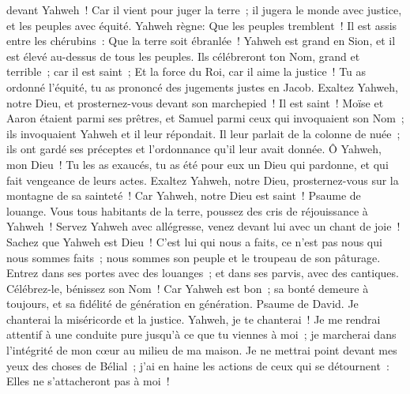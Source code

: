 \begin{multicols}{2}
devant Yahweh~! Car il vient pour juger la terre~; il jugera le monde avec justice, et les peuples avec équité.
\VerseOne{}Yahweh règne: Que les peuples tremblent~! Il est assis entre les chérubins~: Que la terre soit ébranlée~!
Yahweh est grand en Sion, et il est élevé au-dessus de tous les peuples.
Ils célébreront ton Nom, grand et terrible~; car il est saint~;
Et la force du Roi, car il aime la justice~! Tu as ordonné l'équité, tu as prononcé des jugements justes en Jacob.
Exaltez Yahweh, notre Dieu, et prosternez-vous devant son marchepied~! Il est saint~!
Moïse et Aaron étaient parmi ses prêtres, et Samuel parmi ceux qui invoquaient son Nom~; ils invoquaient Yahweh et il leur répondait.
Il leur parlait de la colonne de nuée~; ils ont gardé ses préceptes et l'ordonnance qu'il leur avait donnée.
Ô Yahweh, mon Dieu~! Tu les as exaucés, tu as été pour eux un Dieu qui pardonne, et qui fait vengeance de leurs actes.
Exaltez Yahweh, notre Dieu, prosternez-vous sur la montagne de sa sainteté~! Car Yahweh, notre Dieu est saint~!
\VerseOne{}Psaume de louange. Vous tous habitants de la terre, poussez des cris de réjouissance à Yahweh~!
Servez Yahweh avec allégresse, venez devant lui avec un chant de joie~!
Sachez que Yahweh est Dieu~! C'est lui qui nous a faits, ce n'est pas nous qui nous sommes faits~; nous sommes son peuple et le troupeau de son pâturage.
Entrez dans ses portes avec des louanges~; et dans ses parvis, avec des cantiques. Célébrez-le, bénissez son Nom~!
Car Yahweh est bon~; sa bonté demeure à toujours, et sa fidélité de génération en génération.
\VerseOne{}Psaume de David. Je chanterai la miséricorde et la justice. Yahweh, je te chanterai~!
Je me rendrai attentif à une conduite pure jusqu'à ce que tu viennes à moi~; je marcherai dans l'intégrité de mon cœur au milieu de ma maison.
Je ne mettrai point devant mes yeux des choses de Bélial~; j'ai en haine les actions de ceux qui se détournent~: Elles ne s'attacheront pas à moi~!

\end{multicols}
